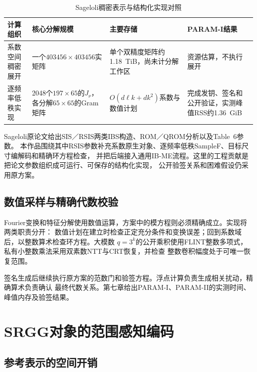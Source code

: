 \begin{table}[H]
\centering\small
\caption{Sageloli稠密表示与结构化实现对照}
\label{tab:sageloli-representation}
\begin{tabularx}{\textwidth}{@{}>{\raggedright\arraybackslash}p{}>{\raggedright\arraybackslash}p{}>{\raggedright\arraybackslash}p{}>{\raggedright\arraybackslash}X@{}}
\toprule
\rowcolor{black!8} 计算组织 & 核心分解规模 & 主要存储 & PARAM-I结果 \\
\midrule
系数空间稠密展开 & 一个$403456\times403456$实矩阵 & 单个双精度矩阵约1.18~TiB，尚未计分解工作区 & 资源估算，不执行展开 \\
逐频率低秩实现 & 2048个$197\times65$的$J_\nu$，各分解$65\times65$的Gram矩阵 & $O(d\ell k+dk^2)$系数与数值计划 & 完成发钥、签名和公开验证，实测峰值RSS约1.36~GiB \\
\bottomrule
\end{tabularx}
\end{table}

Sageloli原论文给出SIS／RSIS两类IBS构造、ROM／QROM分析以及Table~6参数\cite{sageloli2023ibs}。
本作品围绕其中RSIS参数补充系数原生对象、逐频率低秩SampleF、目标尺寸编解码和精确环方程检查，
并把后端接入通用IB-ME流程。这里的工程贡献是把论文参数组织成可运行、可保存的结构化实现，
公开验签关系和困难假设仍采用原方案。

\subsection{数值采样与精确代数校验}

Fourier变换和特征分解使用数值运算，方案中的模方程则必须精确成立。实现将两类职责分开：
数值计划在建立时检查正定充分条件和变换误差；回到系数域后，以整数算术检查环方程。大模数
$q=3^k$的公开乘积使用FLINT整数多项式，私有小整数乘法采用双素数NTT与CRT恢复，并检查
整数卷积幅度处于可唯一恢复范围。

签名生成后继续执行原方案的范数门和验签方程。浮点计算负责生成相关扰动，精确算术负责确认
最终代数关系。第七章给出PARAM-I、PARAM-II的实测时间、峰值内存及验签结果。

\section{SRGG对象的范围感知编码}
\label{sec:srgg-codec}

\subsection{参考表示的空间开销}


